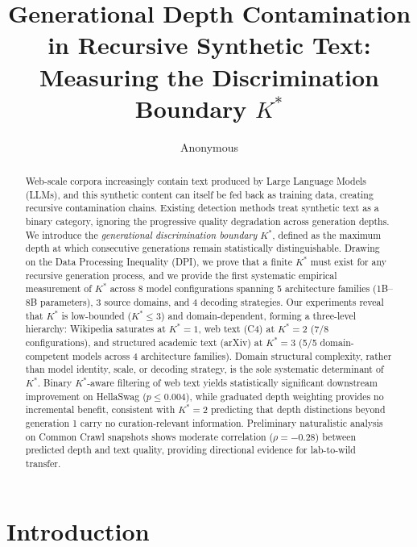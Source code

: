 \documentclass[11pt]{article}
\title{Generational Depth Contamination in Recursive Synthetic Text:\\Measuring the Discrimination Boundary $K^*$}
\author{Anonymous}
\date{}
\begin{document}
\maketitle

\begin{abstract}
Web-scale corpora increasingly contain text produced by Large Language Models (LLMs), and this synthetic content can itself be fed back as training data, creating recursive contamination chains. Existing detection methods treat synthetic text as a binary category, ignoring the progressive quality degradation across generation depths. We introduce the \emph{generational discrimination boundary} $K^*$, defined as the maximum depth at which consecutive generations remain statistically distinguishable. Drawing on the Data Processing Inequality (DPI), we prove that a finite $K^*$ must exist for any recursive generation process, and we provide the first systematic empirical measurement of $K^*$ across 8 model configurations spanning 5 architecture families (1B--8B parameters), 3 source domains, and 4 decoding strategies. Our experiments reveal that $K^*$ is low-bounded ($K^* \le 3$) and domain-dependent, forming a three-level hierarchy: Wikipedia saturates at $K^*{=}1$, web text (C4) at $K^*{=}2$ (7/8 configurations), and structured academic text (arXiv) at $K^*{=}3$ (5/5 domain-competent models across 4 architecture families). Domain structural complexity, rather than model identity, scale, or decoding strategy, is the sole systematic determinant of $K^*$. Binary $K^*$-aware filtering of web text yields statistically significant downstream improvement on HellaSwag ($p \le 0.004$), while graduated depth weighting provides no incremental benefit, consistent with $K^*{=}2$ predicting that depth distinctions beyond generation 1 carry no curation-relevant information. Preliminary naturalistic analysis on Common Crawl snapshots shows moderate correlation ($\rho = -0.28$) between predicted depth and text quality, providing directional evidence for lab-to-wild transfer.
\end{abstract}

\section{Introduction}
\end{document}
